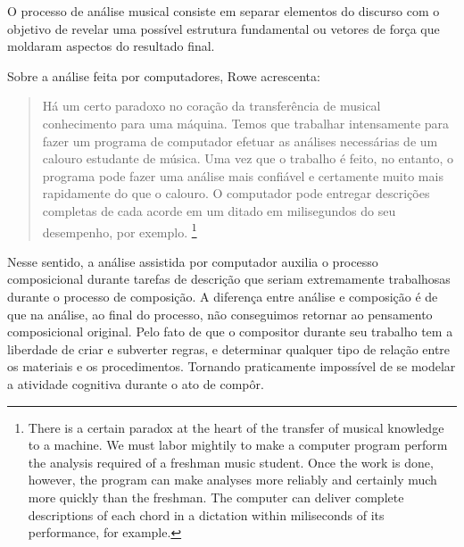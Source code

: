 \documentclass{ppgmus}
\begin{document}

O processo de análise musical consiste em separar elementos
do discurso com o objetivo de revelar uma possível estrutura fundamental
ou vetores de força que moldaram aspectos do resultado final.

Sobre a análise feita por computadores, Rowe acrescenta:

\begin{quote}
Há um certo paradoxo no coração da 
transferência de musical
conhecimento para uma máquina. Temos que trabalhar intensamente para fazer um programa de computador
efetuar as análises necessárias de um calouro estudante de música.
Uma vez que o trabalho é feito, no entanto, o programa pode fazer uma análise mais confiável
e certamente muito mais rapidamente do que o calouro. O computador pode entregar
descrições completas de cada acorde em um ditado em milisegundos
do seu desempenho, por exemplo. \cite{rowe2004machine}
\footnote{There is a certain paradox at the heart of the transfer of musical
knowledge to a machine. We must labor mightily to make a computer
program perform the analysis required of a freshman music student.
Once the work is done, however, the program can make analyses more reliably
and certainly much more quickly than the freshman. The computer can deliver 
complete descriptions of each chord in a dictation within miliseconds
of its performance, for example.}
\end{quote}


Nesse sentido, a análise assistida por computador auxilia
o processo composicional durante tarefas de descrição que seriam
extremamente trabalhosas durante o processo de composição.
A diferença entre análise e composição é de que na análise, ao final do
processo, não conseguimos retornar ao pensamento composicional
original. Pelo fato de que o compositor durante seu trabalho tem a 
liberdade de criar e subverter regras, e determinar qualquer tipo de relação
entre os materiais e os procedimentos. Tornando praticamente impossível
de se modelar a atividade cognitiva durante o ato de compôr.
\end{document}
